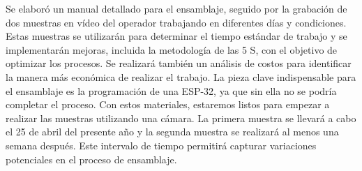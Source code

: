     Se elaboró un manual detallado para el ensamblaje, seguido por la grabación de dos muestras en vídeo del operador trabajando en diferentes días y condiciones. Estas muestras se utilizarán para determinar el tiempo estándar de trabajo y se implementarán mejoras, incluida la metodología de las 5 S, con el objetivo de optimizar los procesos. Se realizará también un análisis de costos para identificar la manera más económica de realizar el trabajo. La pieza clave indispensable para el ensamblaje es la programación de una ESP-32, ya que sin ella no se podría completar el proceso. Con estos materiales, estaremos listos para empezar a realizar las muestras utilizando una cámara. La primera muestra se llevará a cabo el 25 de abril del presente año y la segunda muestra se realizará al menos una semana después. Este intervalo de tiempo permitirá capturar variaciones potenciales en el proceso de ensamblaje.
    
